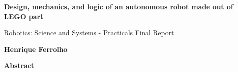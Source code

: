 \thispagestyle{plain}

\begin{center}
    \Large
    \textbf{Design, mechanics, and logic of an autonomous robot made out of LEGO part}

    \vspace{0.4cm}
    \large
    Robotics: Science and Systems - Practicals Final Report

    \vspace{0.4cm}
    \textbf{Henrique Ferrolho}

    \vspace{0.9cm}
    \textbf{Abstract}
\end{center}

\newpage
